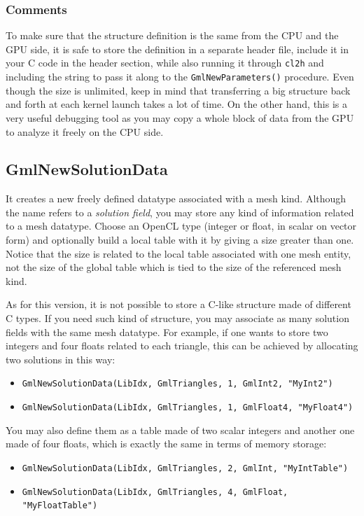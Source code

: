 \documentclass[a4paper,12pt]{article}
\begin{document}
\subsubsection*{Comments}
To make sure that the structure definition is the same from the CPU and the GPU side, it is safe to store the definition in a separate header file, include it in your C code in the header section, while also running it through {\tt cl2h} and including the string to pass it along to the  {\tt GmlNewParameters()} procedure. Even though the size is unlimited, keep in mind that transferring a big structure back and forth at each kernel launch takes a lot of time. On the other hand, this is a very useful debugging tool as you may copy a whole block of data from the GPU to analyze it freely on the CPU side.


\subsection{GmlNewSolutionData}
It creates a new freely defined datatype associated with a mesh kind. Although the name refers to a \emph{solution field}, you may store any kind of information related to a mesh datatype. Choose an OpenCL type (integer or float, in scalar on vector form) and optionally build a local table with it by giving a size greater than one. Notice that the size is related to the local table associated with one mesh entity, not the size of the global table which is tied to the size of the referenced mesh kind.

As for this version, it is not possible to store a C-like structure made of different C types. If you need such kind of structure, you may associate as many solution fields with the same mesh datatype. For example, if one wants to store two integers and four floats related to each triangle, this can be achieved by allocating two solutions in this way:
\begin{itemize}
\item {\tt GmlNewSolutionData(LibIdx, GmlTriangles, 1, GmlInt2, "MyInt2")}
\item {\tt GmlNewSolutionData(LibIdx, GmlTriangles, 1, GmlFloat4, "MyFloat4")}
\end{itemize}
You may also define them as a table made of two scalar integers and another one made of four floats, which is exactly the same in terms of memory storage:
\begin{itemize}
\item {\tt GmlNewSolutionData(LibIdx, GmlTriangles, 2, GmlInt, "MyIntTable")}
\item {\tt GmlNewSolutionData(LibIdx, GmlTriangles, 4, GmlFloat, "MyFloatTable")}
\end{itemize}
\end{document}
